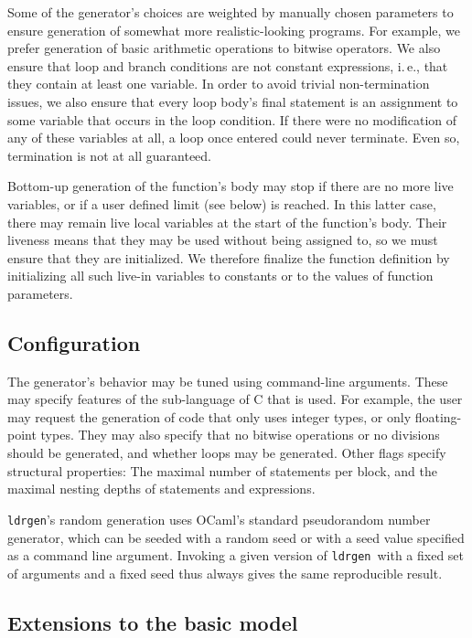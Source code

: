 \documentclass{llncs}
\newcommand\ldrgen{\texttt{ldrgen}}
\begin{document}
Some of the generator's choices are weighted by manually chosen parameters
to ensure generation of somewhat more realistic-looking programs. For
example, we prefer generation of basic arithmetic operations to bitwise
operators. We also ensure that loop and branch conditions are not constant
expressions, i.\,e., that they contain at least one variable. In order to
avoid trivial non-termination issues, we also ensure that every loop body's
final statement is an assignment to some variable that occurs in the loop
condition. If there were no modification of any of these variables at all, a
loop once entered could never terminate. Even so, termination is not at all
guaranteed.

Bottom-up generation of the function's body may stop if there are no more
live variables, or if a user defined limit (see below) is reached. In this
latter case, there may remain live local variables at the start of the
function's body. Their liveness means that they may be used without being
assigned to, so we must ensure that they are initialized. We therefore
finalize the function definition by initializing all such live-in variables
to constants or to the values of function parameters.

\subsection{Configuration}

The generator's behavior may be tuned using command-line arguments. These
may specify features of the sub-language of C that is used. For example, the
user may request the generation of code that only uses integer types, or
only floating-point types. They may also specify that no bitwise operations
or no divisions should be generated, and whether loops may be generated.
Other flags specify structural properties: The maximal number of statements
per block, and the maximal nesting depths of statements and expressions.

\ldrgen's random generation uses OCaml's standard pseudorandom number
generator, which can be seeded with a random seed or with a seed value
specified as a command line argument. Invoking a given version of \ldrgen\
with a fixed set of arguments and a fixed seed thus always gives the same
reproducible result.

\subsection{Extensions to the basic model}
\end{document}
